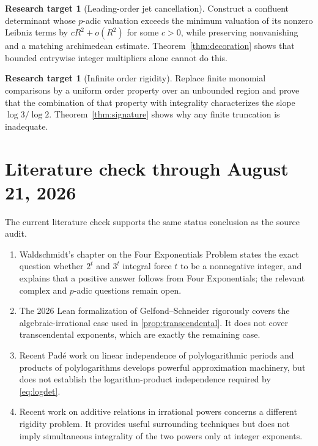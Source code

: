 \documentclass[11pt,oneside]{article}
\theoremstyle{definition}
\newtheorem{problem}[theorem]{Research target}
\theoremstyle{remark}
\begin{document}
\begin{problem}[Leading-order jet cancellation]
Construct a confluent determinant whose $p$-adic valuation exceeds the
minimum valuation of its nonzero Leibniz terms by $cR^2+o(R^2)$ for some
$c>0$, while preserving nonvanishing and a matching archimedean estimate.
Theorem~\ref{thm:decoration} shows that bounded entrywise integer multipliers
alone cannot do this.
\end{problem}

\begin{problem}[Infinite order rigidity]
Replace finite monomial comparisons by a uniform order property over an
unbounded region and prove that the combination of that property with
integrality characterizes the slope $\log3/\log2$.  Theorem~\ref{thm:signature}
shows why any finite truncation is inadequate.
\end{problem}

\section{Literature check through August 21, 2026}
\label{sec:literature}

The current literature check supports the same status conclusion as the
source audit.

\begin{enumerate}[label=(\roman*)]
\item Waldschmidt's chapter on the Four Exponentials Problem states the exact
  question whether $2^t$ and $3^t$ integral force $t$ to be a nonnegative
  integer, and explains that a positive answer follows from Four
  Exponentials; the relevant complex and $p$-adic questions remain open.
\item The 2026 Lean formalization of Gelfond--Schneider rigorously covers the
  algebraic-irrational case used in \cref{prop:transcendental}.  It does not
  cover transcendental exponents, which are exactly the remaining case.
\item Recent Pad\'e work on linear independence of polylogarithmic periods and
  products of polylogarithms develops powerful approximation machinery, but
  does not establish the logarithm-product independence required by
  \eqref{eq:logdet}.
\item Recent work on additive relations in irrational powers concerns a
  different rigidity problem.  It provides useful surrounding techniques but
  does not imply simultaneous integrality of the two powers only at integer
  exponents.
\end{enumerate}
\end{document}
